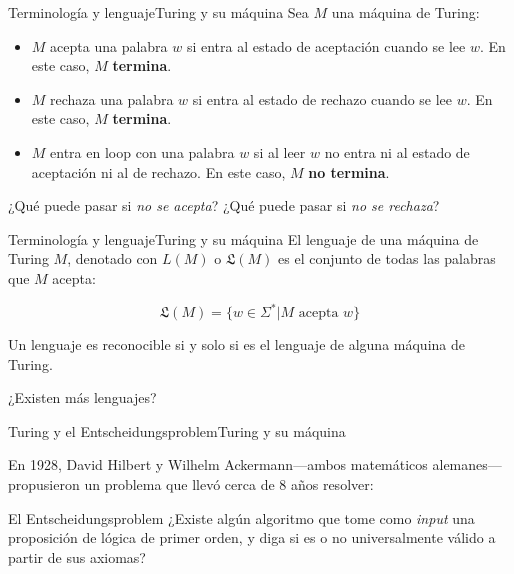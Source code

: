 \documentclass[spanish]{beamer}
\begin{document}
\begin{frame}{Terminología y lenguaje}{Turing y su máquina}
    Sea $M$ una máquina de Turing:

    \bigskip

    \begin{itemize}
        \itemsep1.5ex
        \item $M$ \alert{acepta} una palabra $w$ si entra al estado de aceptación cuando se lee $w$. En este caso, $M$ \textbf{termina}. \pause
        \item $M$ \alert{rechaza} una palabra $w$ si entra al estado de rechazo cuando se lee $w$. En este caso, $M$ \textbf{termina}. \pause
        \item $M$ entra en \alert{loop} con una palabra $w$ si al leer $w$ no entra ni al estado de aceptación ni al de rechazo. En este caso, $M$ \textbf{no termina}. \pause
    \end{itemize}

    ¿Qué puede pasar si \textit{no se acepta}? \pause ¿Qué puede pasar si \textit{no se rechaza}?
\end{frame}

\begin{frame}{Terminología y lenguaje}{Turing y su máquina}
    El lenguaje de una máquina de Turing $M$, denotado con $L(M)$ o $\mathfrak{L}(M)$ es el conjunto de todas las palabras que $M$ acepta: \pause

    $$\mathfrak{L}(M) = \{w \in \Sigma^* | M \text{ acepta } w\}$$

    Un lenguaje es \alert{reconocible} si y solo si es el lenguaje de alguna máquina de Turing. \pause

    \bigskip
    
    ¿Existen más lenguajes?
    
\end{frame}

\begin{frame}{Turing y el Entscheidungsproblem}{Turing y su máquina}

    En 1928, David Hilbert y Wilhelm Ackermann---ambos matemáticos alemanes---propusieron un problema que llevó cerca de 8 años resolver: \pause

    \bigskip
    
    \begin{block}{El Entscheidungsproblem}
        ¿Existe algún algoritmo que tome como \textit{input} una proposición de lógica de primer orden, y diga si es o no universalmente válido a partir de sus axiomas?
    \end{block}
    
\end{frame}
\end{document}
